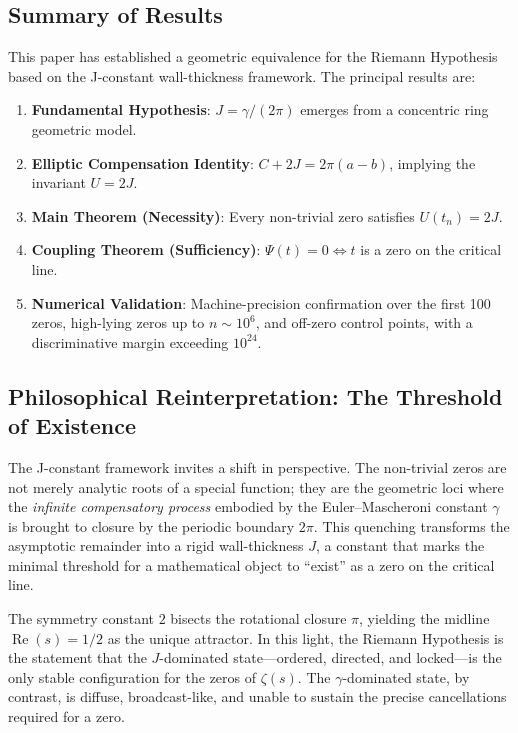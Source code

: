 \documentclass[11pt,a4paper]{article}
\theoremstyle{definition}
\begin{document}
\subsection{Summary of Results}
This paper has established a geometric equivalence for the Riemann Hypothesis based on the J-constant wall-thickness framework. 
The principal results are:
\begin{enumerate}
    \item \textbf{Fundamental Hypothesis}: \(J = \gamma/(2\pi)\) emerges from a concentric ring geometric model.
    \item \textbf{Elliptic Compensation Identity}: \(C + 2J = 2\pi(a-b)\), implying the invariant \(U = 2J\).
    \item \textbf{Main Theorem (Necessity)}: Every non-trivial zero satisfies \(U(t_n) = 2J\).
    \item \textbf{Coupling Theorem (Sufficiency)}: \(\Psi(t) = 0 \iff t\) is a zero on the critical line.
    \item \textbf{Numerical Validation}: Machine-precision confirmation over the first 100 zeros, high-lying zeros up to \(n \sim 10^6\), and off-zero control points, with a discriminative margin exceeding \(10^{24}\).
\end{enumerate}

\subsection{Philosophical Reinterpretation: The Threshold of Existence}
The J-constant framework invites a shift in perspective. 
The non-trivial zeros are not merely analytic roots of a special function; they are the geometric loci where the \emph{infinite compensatory process} embodied by the Euler--Mascheroni constant \(\gamma\) is brought to closure by the periodic boundary \(2\pi\). 
This quenching transforms the asymptotic remainder into a rigid wall-thickness \(J\), a constant that marks the minimal threshold for a mathematical object to ``exist'' as a zero on the critical line.

The symmetry constant \(2\) bisects the rotational closure \(\pi\), yielding the midline \(\operatorname{Re}(s)=1/2\) as the unique attractor. 
In this light, the Riemann Hypothesis is the statement that the \(J\)-dominated state---ordered, directed, and locked---is the only stable configuration for the zeros of \(\zeta(s)\). 
The \(\gamma\)-dominated state, by contrast, is diffuse, broadcast-like, and unable to sustain the precise cancellations required for a zero.
\end{document}

